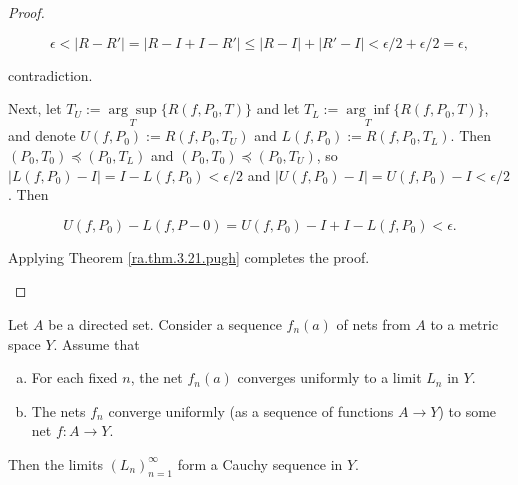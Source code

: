 \begin{proof}
\begin{itemize}
\[
\epsilon < |R - R'| = |R - I + I  - R'| \leq |R - I| + |R' - I| < \epsilon/2 + \epsilon/2 = \epsilon,
\]

contradiction.



Next, let \(T_U :=  \underset{T}{\arg \sup} \{ R(f, P_0, T) \}\) and let \(T_L :=  \underset{T}{\arg \inf} \{ R(f, P_0, T) \}\), and denote \(U(f, P_0) :=R(f, P_0,T_U)\) and \(L(f, P_0) :=R(f, P_0,T_L)\). Then \((P_0, T_0) \preceq (P_0,T_L)\) and \((P_0, T_0) \preceq (P_0,T_U)\), so \(|L(f, P_0) - I| = I - L(f, P_0)  < \epsilon/2\) and \(|U(f, P_0) - I| = U(f, P_0) - I < \epsilon/2\). Then

\[
U(f,P_0) - L(f,P-0) =  U(f,P_0) - I + I - L(f,P_0) 
< \epsilon.
\]

Applying Theorem \ref{ra.thm.3.21.pugh} completes the proof.





\end{itemize}

\end{proof}

\begin{lemma}\label{ra.425b.hw2.2a.lemma}

Let \(A\) be a directed set. Consider a sequence \(f_n(a)\) of nets from \(A\) to a metric space \(Y\). Assume that

\begin{enumerate}[(a)]

\item For each fixed \(n\), the net \(f_n(a)\) converges uniformly to a limit \(L_n\) in \(Y\).

\item The nets \(f_n\) converge uniformly (as a sequence of functions \(A \to Y\)) to some net \(f: A \to Y\).

\end{enumerate}

Then the limits \((L_n)_{n=1}^\infty\) form a Cauchy sequence in \(Y\).

\end{lemma}

